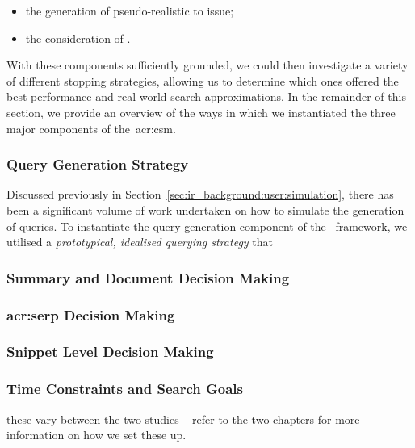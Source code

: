 \begin{itemize}
    \item{the generation of pseudo-realistic  to issue;}
    \item{the consideration of .}
\end{itemize}

With these components sufficiently grounded, we could then investigate a variety of different stopping strategies, allowing us to determine which ones offered the best performance and real-world search approximations. In the remainder of this section, we provide an overview of the ways in which we instantiated the three major components of the~\gls{acr:csm}.

\subsubsection{Query Generation Strategy}
Discussed previously in Section~\ref{sec:ir_background:user:simulation}, there has been a significant volume of work undertaken on how to simulate the generation of queries. To instantiate the query generation component of the \simiir~framework, we utilised a \emph{prototypical, idealised querying strategy} that


\subsubsection{Summary and Document Decision Making}


\subsubsection{\gls{acr:serp} Decision Making}


\subsubsection{Snippet Level Decision Making}


\subsubsection{Time Constraints and Search Goals}
these vary between the two studies -- refer to the two chapters for more information on how we set these up.

